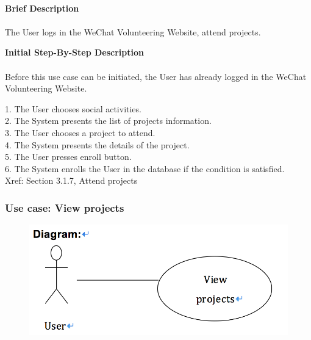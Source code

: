 \documentclass[12pt]{report}
\begin{document}
\paragraph{}
\begin{flushleft}
\textbf{Brief Description }
\paragraph{}
The User logs in the WeChat Volunteering Website, attend projects.\\

\begin{flushleft}
\textbf{Initial Step-By-Step Description }
\paragraph{}
Before this use case can be initiated, the User has already logged in the WeChat Volunteering Website.

\begin{flushleft}
1.	The User chooses social activities. \\
2.	The System presents the list of projects information. \\
3.	The User chooses a project to attend. \\
4.	The System presents the details of the project. \\
5.	The User presses enroll button. \\
6.	The System enrolls the User in the database if the condition is satisfied. \\
Xref: Section 3.1.7, Attend projects
\end{flushleft}
\end{flushleft}
\end{flushleft}


\newpage
\subsubsection{Use case:  View projects}

\begin{figure}[!htb]
  \includegraphics{8.PNG}
\end{figure}
\end{document}
